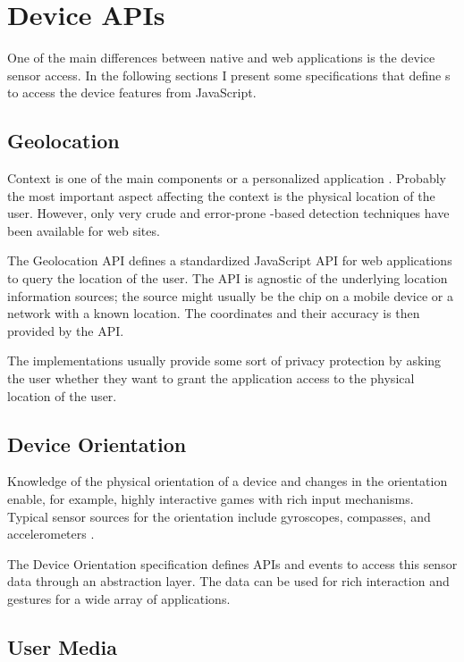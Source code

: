 \section{Device APIs}

One of the main differences between native and web applications is the
device sensor access. In the following sections I present some
specifications that define s to access the device features
from JavaScript.

\subsection{Geolocation}

Context is one of the main components or a personalized application
\cite{fling2009mobile}. Probably the most important aspect affecting
the context is the physical location of the user. However, only very
crude and error-prone -based detection techniques have been
available for web sites.

The Geolocation API defines a standardized JavaScript API for web
applications to query the location of the user. The API is agnostic of
the underlying location information sources; the source might usually
be the  chip on a mobile device or a  network
with a known location. The coordinates and their accuracy is then
provided by the API. \cite{geolocationAPI}

The implementations usually provide some sort of privacy protection by
asking the user whether they want to grant the application access to
the physical location of the user.

\subsection{Device Orientation}

Knowledge of the physical orientation of a device and changes in the
orientation enable, for example, highly interactive games with rich
input mechanisms. Typical sensor sources for the orientation include
gyroscopes, compasses, and accelerometers \cite{DeviceOrientation}.

The Device Orientation specification \cite{DeviceOrientation} defines
APIs and events to access this sensor data through an abstraction
layer. The data can be used for rich interaction and gestures for a
wide array of applications.

\subsection{User Media}
\label{section:getusermedia}

